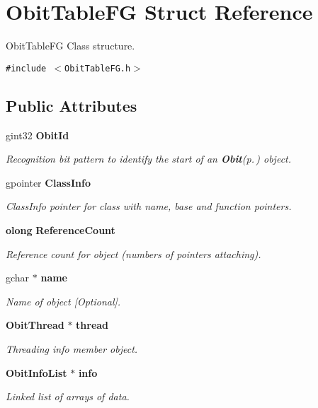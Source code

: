 \section{Obit\-Table\-FG Struct Reference}
\label{structObitTableFG}
Obit\-Table\-FG Class structure.  


{\tt \#include $<$Obit\-Table\-FG.h$>$}

\subsection*{Public Attributes}
\begin{CompactItemize}
\item 
gint32 {\bf Obit\-Id}
\begin{CompactList}\small\item\em Recognition bit pattern to identify the start of an {\bf Obit}{\rm (p.\,\pageref{structObit})} object. \item\end{CompactList}\item 
gpointer {\bf Class\-Info}
\begin{CompactList}\small\item\em Class\-Info pointer for class with name, base and function pointers. \item\end{CompactList}\item 
{\bf olong} {\bf Reference\-Count}
\begin{CompactList}\small\item\em Reference count for object (numbers of pointers attaching). \item\end{CompactList}\item 
gchar $\ast$ {\bf name}
\begin{CompactList}\small\item\em Name of object [Optional]. \item\end{CompactList}\item 
{\bf Obit\-Thread} $\ast$ {\bf thread}
\begin{CompactList}\small\item\em Threading info member object. \item\end{CompactList}\item 
{\bf Obit\-Info\-List} $\ast$ {\bf info}
\begin{CompactList}\small\item\em Linked list of arrays of data. \item\end{CompactList}\item 

\end{CompactItemize}

